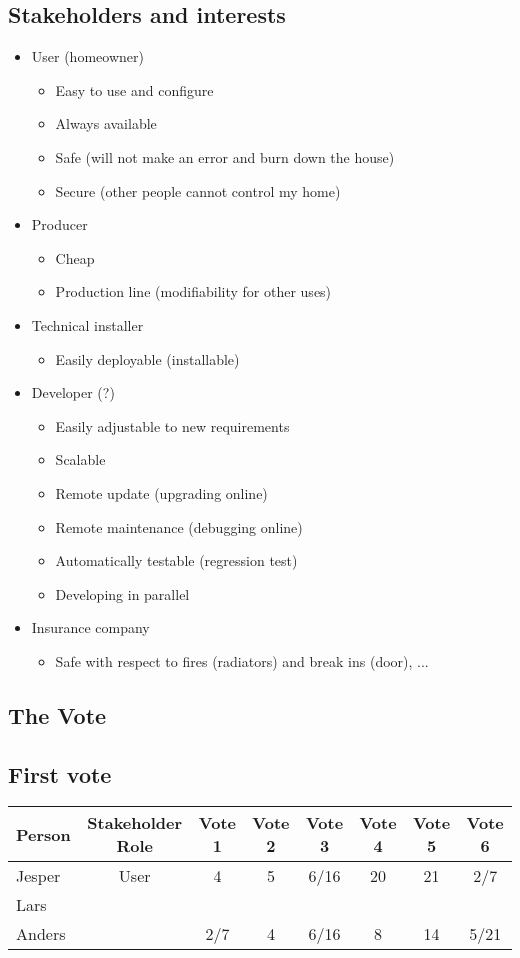 \documentclass[a4paper,10pt]{article}
\begin{document}
\subsection{Stakeholders and interests}
\begin{itemize}
\item User (homeowner)
\begin{itemize}
\item Easy to use and configure
\item Always available
\item Safe (will not make an error and burn down the house)
\item Secure (other people cannot control my home)
\end{itemize}
\item Producer
\begin{itemize}
\item Cheap
\item Production line (modifiability for other uses)
\end{itemize}
\item Technical installer
\begin{itemize}
\item Easily deployable (installable)
\end{itemize}
\item Developer (?)
\begin{itemize}
\item Easily adjustable to new requirements
\item Scalable
\item Remote update (upgrading online)
\item Remote maintenance (debugging online)
\item Automatically testable (regression test)
\item Developing in parallel
\end{itemize}
\item Insurance company
\begin{itemize}
\item Safe with respect to fires (radiators) and break ins (door), ...
\end{itemize}
\end{itemize}

\subsection{The Vote}
\subsection{First vote}
\begin{tabular}{|l|c|c|c|c|c|c|c|}
\hline
Person & Stakeholder Role & Vote 1 & Vote 2 & Vote 3 & Vote 4 & Vote 5 & Vote 6\\
\hline
Jesper&User&4&5&6/16&20&21&2/7\\
Lars& & & & & & & \\
Anders& &2/7&4&6/16&8&14&5/21\\
\hline
\end{tabular}
\end{document}
